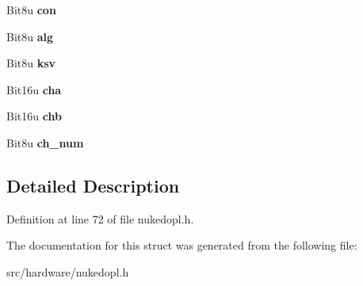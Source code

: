 \begin{DoxyCompactItemize}
\item 
\hypertarget{struct__opl3__channel_abd85759b17c14346afff6baa37c2871f}{Bit8u {\bfseries con}}\label{struct__opl3__channel_abd85759b17c14346afff6baa37c2871f}

\item 
\hypertarget{struct__opl3__channel_a8dd6ce9d04ac84992b7d7a35dd6f6716}{Bit8u {\bfseries alg}}\label{struct__opl3__channel_a8dd6ce9d04ac84992b7d7a35dd6f6716}

\item 
\hypertarget{struct__opl3__channel_a34df82d18d35472e4ca61823cf2cd223}{Bit8u {\bfseries ksv}}\label{struct__opl3__channel_a34df82d18d35472e4ca61823cf2cd223}

\item 
\hypertarget{struct__opl3__channel_ab24df395c05f0a0999e341fdeef713b4}{Bit16u {\bfseries cha}}\label{struct__opl3__channel_ab24df395c05f0a0999e341fdeef713b4}

\item 
\hypertarget{struct__opl3__channel_a116f161b74649809f3dad31b13131799}{Bit16u {\bfseries chb}}\label{struct__opl3__channel_a116f161b74649809f3dad31b13131799}

\item 
\hypertarget{struct__opl3__channel_a882c7083e1ed51721dc0386fe422cff6}{Bit8u {\bfseries ch\-\_\-num}}\label{struct__opl3__channel_a882c7083e1ed51721dc0386fe422cff6}

\end{DoxyCompactItemize}


\subsection{Detailed Description}


Definition at line 72 of file nukedopl.\-h.



The documentation for this struct was generated from the following file\-:\begin{DoxyCompactItemize}
\item 
src/hardware/nukedopl.\-h\end{DoxyCompactItemize}
